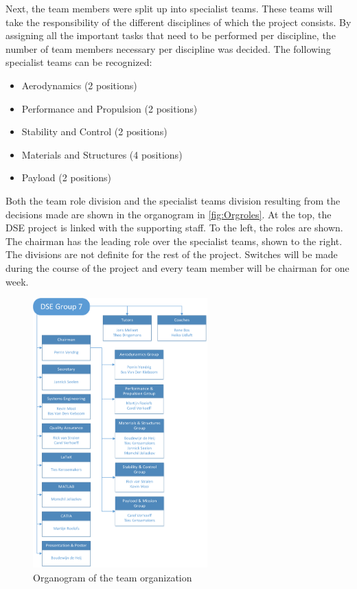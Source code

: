 \documentclass[a4paper]{report}
\begin{document}
Next, the team members were split up into specialist teams. These teams will take the responsibility of the different disciplines of which the project consists. By assigning all the important tasks that need to be performed per discipline, the number of team members necessary per discipline was decided. The following specialist teams can be recognized:

\begin{itemize}
\item Aerodynamics (2 positions)
\item Performance and Propulsion (2 positions)
\item Stability and Control (2 positions)
\item Materials and Structures (4 positions)
\item Payload (2 positions)
\end{itemize}

Both the team role division and the specialist teams division resulting from the decisions made are shown in the organogram in \autoref{fig:Orgroles}. At the top, the DSE project is linked with the supporting staff. To the left, the roles are shown. The chairman has the leading role over the specialist teams, shown to the right. 
The divisions are not definite for the rest of the project. Switches will be made during the course of the project and every team member will be chairman for one week. 


\begin{figure}[h]
\centering
\includegraphics[width=0.6\textwidth]{Figures/Organogram2.png}
\caption{Organogram of the team organization}
\label{fig:Orgroles}
\end{figure}

\end{document}
